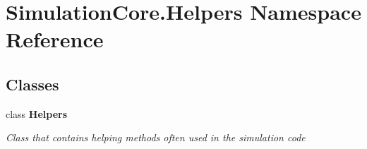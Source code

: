 \hypertarget{namespace_simulation_core_1_1_helpers}{}\section{Simulation\+Core.\+Helpers Namespace Reference}
\label{namespace_simulation_core_1_1_helpers}
\subsection*{Classes}
\begin{DoxyCompactItemize}
\item 
class {\bfseries Helpers}
\begin{DoxyCompactList}\small\item\em Class that contains helping methods often used in the simulation code \end{DoxyCompactList}\end{DoxyCompactItemize}
